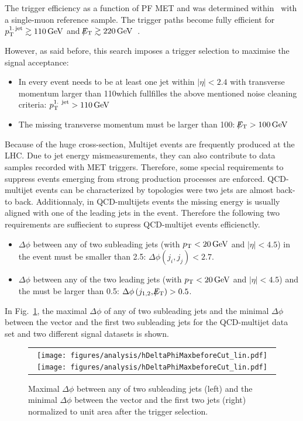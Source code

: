 The trigger efficiency as a function of PF MET and \ptfirstjet was determined within~\cite{bib:CMS:DM_8TeV} with a single-muon reference sample.
The trigger paths become fully efficient for $p_{\text{T}}^{\text{1.\,jet}} \gtrsim 110\,\text{Ge}\kern-0.06667em\text{V}$ and $\slash\mkern-12mu{E}_{\text{T}} \gtrsim 220\,\text{Ge}\kern-0.06667em\text{V}$~\cite{bib:CMS:DM_8TeV_AN}.

However, as said before, this search imposes a trigger selection to maximise the signal acceptance:
\begin{itemize}
\renewcommand{\labelitemi}{\footnotesize{\ding{118}}}
\item In every event needs to be at least one jet within $|\eta|<2.4$ with transverse momentum larger than 110\gev which fullfilles the above mentioned noise cleaning criteria: \mbox{$p_{\text{T}}^{\text{1. jet}}>110\,\text{Ge}\kern-0.06667em\text{V}$}
\item The missing transverse momentum must be larger than 100\gev: \mbox{$\slash\mkern-12mu{E}_{\text{T}}>100\,\text{Ge}\kern-0.06667em\text{V}$}
\end{itemize}

\hspace{0.9cm}

Because of the huge cross-section, Multijet events are frequently produced at the LHC.
Due to jet energy mismeasurements, they can also contribute to data samples recorded with MET triggers.
Therefore, some special requirements to suppress events emerging from strong production processes are enforced.
QCD-multijet events can be characterized by topologies were two jets are almost back-to back.
Additionnaly, in QCD-multijets events the missing energy is usually aligned with one of the leading jets in the event.
Therefore the following two requirements are suffiecient to supress QCD-multijet events efficienctly.
\begin{itemize}
\renewcommand{\labelitemi}{\footnotesize{\ding{118}}}
\item $\Delta\phi$ between any of two subleading jets (with $p_{\text{T}}<20\,\text{Ge}\kern-0.06667em\text{V}$ and $|\eta|<4.5$) in the event must be smaller than 2.5: \mbox{$\Delta\phi\left( j_i, j_j\right)<2.7$}.
\item $\Delta\phi$ between any of the two leading jets (with $p_{\text{T}}<20\,\text{Ge}\kern-0.06667em\text{V}$ and $|\eta|<4.5$) and the \met must be larger than 0.5: \mbox{$\Delta\phi\left( j_{1,2}, \slash\mkern-12mu{E}_{\text{T}} \right) > 0.5$.} 
\end{itemize}
In Fig.~\ref{fig:QCDcuts}, the maximal $\Delta \phi$ of any of two subleading jets  and the minimal $\Delta \phi$ between the \met vector and the first two subleading jets for the QCD-multijet data set and two different signal datasets is shown.\\
\begin{figure}[!t]
  \centering 
  \begin{tabular}{c}
    \texttt{[image: figures/analysis/hDeltaPhiMaxbeforeCut\_lin.pdf]}
    \texttt{[image: figures/analysis/hDeltaPhiMaxbeforeCut\_lin.pdf]}
  \end{tabular}
  \caption{Maximal $\Delta \phi$ between any of two subleading jets (left) and the minimal $\Delta \phi$  between the \met vector and the first two jets (right) normalized to unit area after the trigger selection.}
  \label{fig:QCDcuts}
\end{figure}
\hspace{0.9cm}

